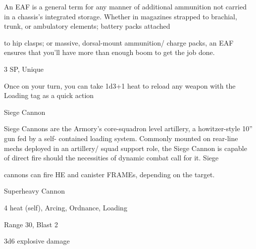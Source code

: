 An EAF is a general term for any manner of additional ammunition not carried in a chassis's integrated
storage. Whether in magazines strapped to brachial, trunk, or ambulatory elements; battery packs attached

to hip clasps; or massive, dorsal-mount ammunition/ charge packs, an EAF ensures that you'll have more
than enough boom to get the job done.

3 SP, Unique

Once on your turn, you can take 1d3+1 heat to reload any weapon with the Loading tag as a
quick action


Siege Cannon

Siege Cannons are the Armory's core-squadron level artillery, a howitzer-style 10'' gun fed by a self-
contained loading system. Commonly mounted on rear-line mechs deployed in an artillery/ squad support
role, the Siege Cannon is capable of direct fire should the necessities of dynamic combat call for it. Siege

cannons can fire HE and canister FRAMEs, depending on the target.

Superheavy Cannon

4 heat (self), Arcing, Ordnance, Loading

Range 30, Blast 2

3d6 explosive damage

